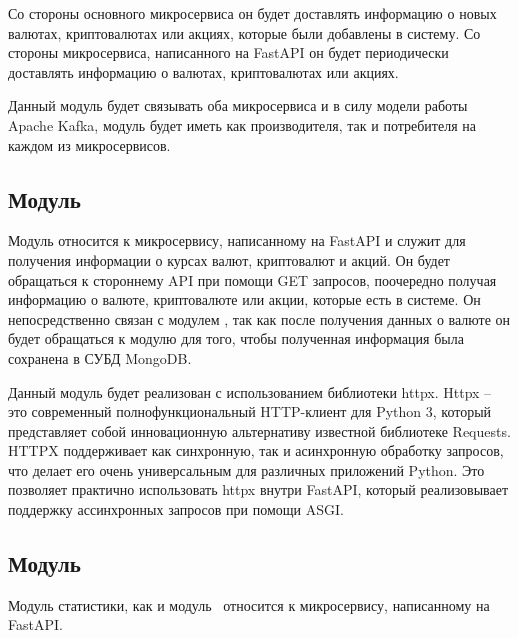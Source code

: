 Со стороны основного микросервиса он будет доставлять информацию о новых валютах, криптовалютах или акциях, которые были добавлены в систему.
Со стороны микросервиса, написанного на FastAPI он будет периодически доставлять информацию о валютах, криптовалютах или акциях.

Данный модуль будет связывать оба микросервиса и
в силу модели работы Apache Kafka, модуль будет иметь как производителя, так и потребителя на каждом из микросервисов.

\subsection{Модуль \moduleParsing}
Модуль \moduleParsing относится к микросервису, написанному на FastAPI и служит для получения информации о курсах валют, криптовалют и акций.
Он будет обращаться к стороннему API при помощи GET запросов, поочередно получая информацию о валюте, криптовалюте или акции, которые есть в системе.
Он непосредственно связан с модулем \moduleCommunicationMongoDB, так как
после получения данных о валюте он будет обращаться к модулю для того, чтобы полученная информация была сохранена в СУБД MongoDB.

Данный модуль будет реализован с использованием библиотеки httpx.
Httpx -- это современный полнофункциональный HTTP-клиент для Python 3, который представляет собой инновационную альтернативу известной библиотеке Requests.
HTTPX поддерживает как синхронную, так и асинхронную обработку запросов, что делает его очень универсальным для различных приложений Python.
Это позволяет практично использовать httpx внутри FastAPI, который реализовывает поддержку ассинхронных запросов при помощи ASGI\cite{asgi_docs}.


\subsection{Модуль \moduleStatistics}
Модуль статистики, как и модуль \moduleParsing~относится к микросервису, написанному на FastAPI.

